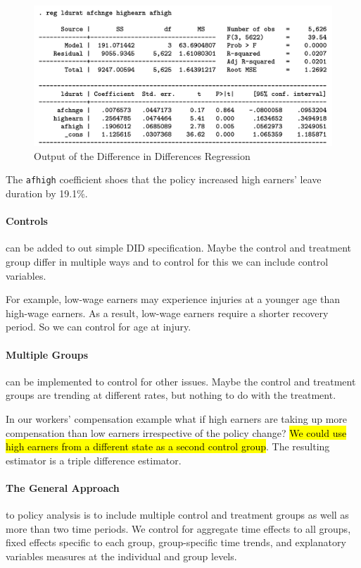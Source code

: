 \documentclass[11pt]{article}
\begin{document}
    \begin{figure}[h]
        \centering
        \includegraphics[width=15cm]{photos/did output.png}
        \caption{Output of the Difference in Differences Regression}
        \label{fig:DID output}
    \end{figure}
\begin{mdframed}  
    The \lstinline{afhigh} coefficient shoes that the policy increased high earners' leave duration by 19.1\%.
\end{mdframed}

\paragraph{Controls} can be added to out simple DID specification. Maybe the control and treatment group differ in multiple ways and to control for this we can include control variables.

For example, low-wage earners may experience injuries at a younger age than high-wage earners. As a result, low-wage earners require a shorter recovery period. So we can control for age at injury.

\paragraph{Multiple Groups} can be implemented to control for other issues. Maybe the control and treatment groups are trending at different rates, but nothing to do with the treatment.

In our workers' compensation example what if high earners are taking up more compensation than low earners irrespective of the policy change? \hl{We could use high earners from a different state as a second control group}. The resulting estimator is a triple difference estimator.

\paragraph{The General Approach} to policy analysis is to include multiple control and treatment groups as well as more than two time periods. We control for aggregate time effects to all groups, fixed effects specific to each group, group-specific time trends, and explanatory variables measures at the individual and group levels.
\end{document}

